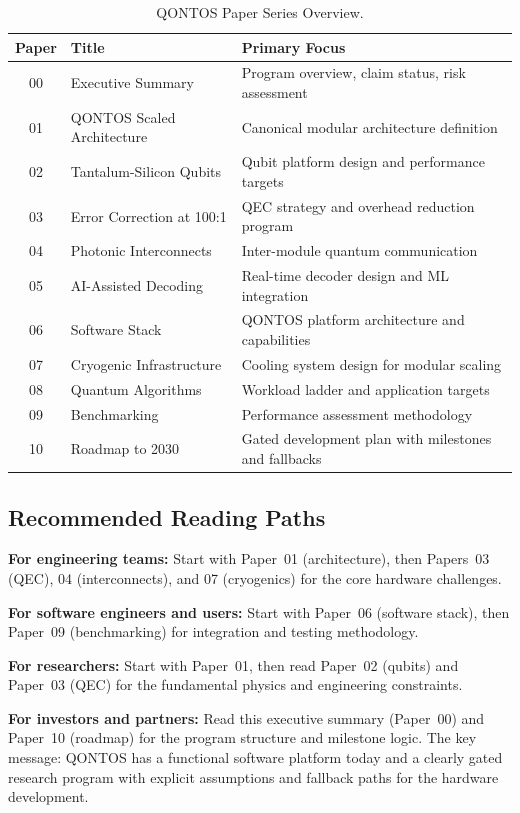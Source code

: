 \documentclass[conference]{IEEEtran}
\begin{document}
\begin{table}[htbp]
\centering
\caption{QONTOS Paper Series Overview.}
\label{tab:paper_series}
\begin{tabular}{clp{3.5cm}}
\toprule
\textbf{Paper} & \textbf{Title} & \textbf{Primary Focus} \\
\midrule
00 & Executive Summary    & Program overview, claim status, risk assessment \\
01 & QONTOS Scaled Architecture & Canonical modular architecture definition \\
02 & Tantalum-Silicon Qubits & Qubit platform design and performance targets \\
03 & Error Correction at 100:1 & QEC strategy and overhead reduction program \\
04 & Photonic Interconnects & Inter-module quantum communication \\
05 & AI-Assisted Decoding & Real-time decoder design and ML integration \\
06 & Software Stack       & QONTOS platform architecture and capabilities \\
07 & Cryogenic Infrastructure & Cooling system design for modular scaling \\
08 & Quantum Algorithms   & Workload ladder and application targets \\
09 & Benchmarking         & Performance assessment methodology \\
10 & Roadmap to 2030      & Gated development plan with milestones and fallbacks \\
\bottomrule
\end{tabular}
\end{table}

\subsection{Recommended Reading Paths}

\textbf{For engineering teams:} Start with Paper~01 (architecture), then Papers~03 (QEC), 04 (interconnects), and 07 (cryogenics) for the core hardware challenges.

\textbf{For software engineers and users:} Start with Paper~06 (software stack), then Paper~09 (benchmarking) for integration and testing methodology.

\textbf{For researchers:} Start with Paper~01, then read Paper~02 (qubits) and Paper~03 (QEC) for the fundamental physics and engineering constraints.

\textbf{For investors and partners:} Read this executive summary (Paper~00) and Paper~10 (roadmap) for the program structure and milestone logic. The key message: QONTOS has a functional software platform today and a clearly gated research program with explicit assumptions and fallback paths for the hardware development.
\end{document}
